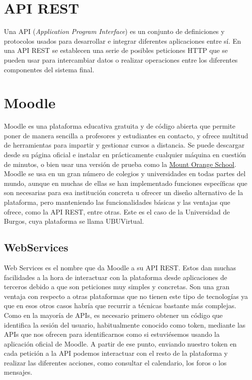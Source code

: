 
\section{API REST}
Una API (\textit{Application Program Interface}) es un conjunto de definiciones y protocolos usados para desarrollar e integrar diferentes aplicaciones entre sí. En una API REST \cite{restapi} se establecen una serie de posibles peticiones HTTP que se pueden usar para intercambiar datos o realizar operaciones entre los diferentes componentes del sistema final.

\section{Moodle}
Moodle \cite{moodle} es una plataforma educativa gratuita y de código abierta que permite poner de manera sencilla a profesores y estudiantes en contacto, y ofrece multitud de herramientas para impartir y gestionar cursos a distancia. Se puede descargar desde su página oficial e instalar en prácticamente cualquier máquina en cuestión de minutos, o bien usar una versión de prueba como la \href{https://school.moodledemo.net/}{Mount Orange School}.
Moodle se usa en un gran número de colegios y universidades en todas partes del mundo, aunque en muchas de ellas se han implementado funciones específicas que son necesarias para esa institución concreta u ofrecer un diseño alternativo de la plataforma, pero manteniendo las funcionalidades básicas y las ventajas que ofrece, como la API REST, entre otras.
Este es el caso de la Universidad de Burgos, cuya plataforma se llama UBUVirtual.
\subsection{WebServices}
Web Services \cite{webservices} es el nombre que da Moodle a su API REST. Estos dan muchas facilidades a la hora de interactuar con la plataforma desde aplicaciones de terceros debido a que son peticiones muy simples y concretas. Son una gran ventaja con respecto a otras plataformas que no tienen este tipo de tecnologías ya que en esos otros casos habría que recurrir a técnicas bastante más complejas.
Como en la mayoría de APIs, es necesario primero obtener un código que identifica la sesión del usuario, habitualmente conocido como token, mediante las APIs que nos ofrecen para identificarnos como si estuviésemos usando la aplicación oficial de Moodle. A partir de ese punto, enviando nuestro token en cada petición a la API podemos interactuar con el resto de la plataforma y realizar las diferentes acciones, como consultar el calendario, los foros o los mensajes.

